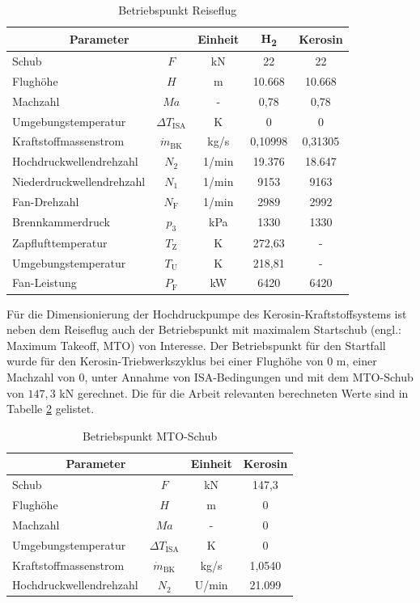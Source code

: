 \begin{table}[ht]
    \centering
	\caption{Betriebspunkt Reiseflug}
	\begin{tabular} {|l|c|c|c|c|} \hline%
    \multicolumn{2}{|c|}{Parameter} & Einheit & H\textsubscript{2} & Kerosin \\ \hline\hline%
    Schub & $F$ & kN & 22 & 22 \\ \hline
    Flughöhe & $H$ & m & 10.668 & 10.668 \\ \hline
    Machzahl & $Ma$ & - & 0,78 & 0,78 \\ \hline
    Umgebungstemperatur & $\Delta T_{\mathrm{ISA}}$ & K & 0 & 0 \\ \hline
    Kraftstoffmassenstrom & $\dot{m}_\mathrm{BK}$& kg/s & 0,10998 & 0,31305 \\ \hline
    Hochdruckwellendrehzahl & $N_2$ & 1/min & 19.376 & 18.647 \\ \hline
    Niederdruckwellendrehzahl & $N_1$ & 1/min & 9153 & 9163 \\ \hline
    Fan-Drehzahl & $N_\mathrm{F}$ & 1/min & 2989 & 2992 \\ \hline
    Brennkammerdruck & $p_3$ & kPa & 1330 & 1330 \\ \hline
    Zapflufttemperatur & $T_{\mathrm{Z}}$ & K & 272,63 & - \\ \hline
    Umgebungstemperatur & $T_\mathrm{U}$ & K & 218,81 & - \\ \hline
    Fan-Leistung & $P_\mathrm{F}$ & kW & 6420 & 6420 \\ \hline
    \end{tabular}	
    \label{Tab:cruise}%
\end{table}
\FloatBarrier 

Für die Dimensionierung der Hochdruckpumpe des Kerosin-Kraftstoffsystems ist neben dem Reiseflug auch der Betriebspunkt mit maximalem Startschub (engl.: Maximum Takeoff, MTO) von Interesse. Der Betriebspunkt für den Startfall wurde für den Kerosin-Triebwerkszyklus bei einer Flughöhe von $0$ m, einer Machzahl von $0$, unter Annahme von ISA-Bedingungen und mit dem MTO-Schub von $147,3$ kN gerechnet. Die für die Arbeit relevanten berechneten Werte sind in Tabelle \ref{Tab:mto} gelistet.

\begin{table}[ht]
    \centering
	\caption{Betriebspunkt MTO-Schub}
	\begin{tabular} {|l|c|c|c|} \hline%
    \multicolumn{2}{|c|}{Parameter} & Einheit & Kerosin \\ \hline\hline%
    Schub & $F$ & kN & 147,3 \\ \hline
    Flughöhe & $H$ & m & 0 \\ \hline
    Machzahl & $Ma$ & - & 0 \\ \hline
    Umgebungstemperatur & $\Delta T_\mathrm{ISA}$ & K & 0 \\ \hline
    Kraftstoffmassenstrom & $\dot{m}_\mathrm{BK}$& kg/s & 1,0540  \\ \hline
    Hochdruckwellendrehzahl & $N_2$ & U/min & 21.099 \\ \hline
    \end{tabular}	
    \label{Tab:mto}%
\end{table}
\FloatBarrier 

